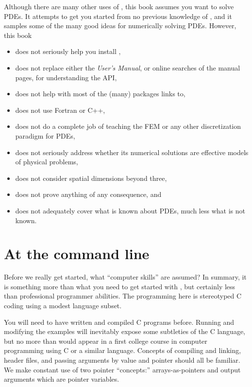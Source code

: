 Although there are many other uses of \PETSc, this book assumes you want to solve PDEs.  It attempts to get you started from no previous knowledge of \PETSc, and it samples some of the many good ideas for numerically solving PDEs.  However, this book\begin{itemize}
\item  does not seriously help you install \PETSc,
\item  does not replace either the \PETSc \emph{User's Manual}, or online searches of the \PETSc manual pages, for understanding the API,
\item  does not help with most of the (many) packages \PETSc links to,
\item  does not use Fortran or C++,
\item  does not do a complete job of teaching the FEM or any other discretization paradigm for PDEs,
\item  does not seriously address whether its numerical solutions are effective models of physical problems,
\item  does not consider spatial dimensions beyond three,
\item  does not prove anything of any consequence, and
\item  does not adequately cover what is known about PDEs, much less what is not known.
\end{itemize}


\section{At the command line}

Before we really get started, what ``computer skills'' are assumed?  In summary, it is something more than what you need to get started with \Matlab, but certainly less than professional programmer abilities.  The programming here is stereotyped C coding using a modest language subset.

You will need to have written and compiled C programs before.   Running and modifying the examples will inevitably expose some subtleties of the C language, but no more than would appear in a first college course in computer programming using C or a similar language.  Concepts of compiling and linking, header files,  and passing arguments by value and pointer should all be familiar.  We make constant use of two pointer ``concepts:'' arrays-as-pointers and output arguments which are pointer variables.

